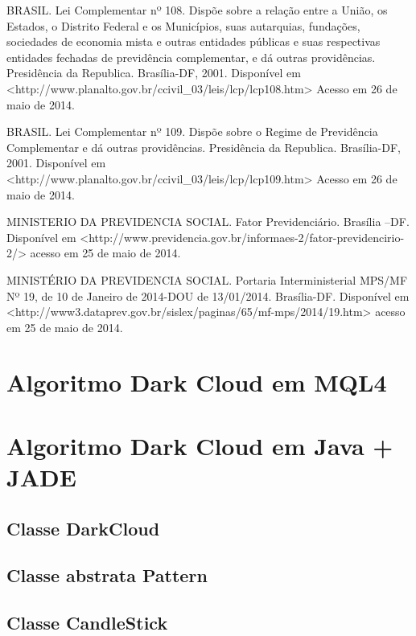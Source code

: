\begin{apendicesenv}
BRASIL. Lei Complementar nº 108. Dispõe sobre a relação entre a União, os Estados, o Distrito Federal e os Municípios, suas autarquias, fundações, sociedades de economia mista e outras entidades públicas e suas respectivas entidades fechadas de previdência complementar, e dá outras providências. Presidência da Republica. Brasília-DF, 2001. Disponível em  <http://www.planalto.gov.br/ccivil\_03/leis/lcp/lcp108.htm> Acesso em 26 de maio de 2014.

BRASIL. Lei Complementar nº 109. Dispõe sobre o Regime de Previdência Complementar e dá outras providências. Presidência da Republica. Brasília-DF, 2001. Disponível em <http://www.planalto.gov.br/ccivil\_03/leis/lcp/lcp109.htm> Acesso em 26 de maio de 2014.

MINISTERIO DA PREVIDENCIA SOCIAL. Fator Previdenciário. Brasília –DF. Disponível em <http://www.previdencia.gov.br/informaes-2/fator-previdencirio-2/> acesso em 25 de maio de 2014.

MINISTÉRIO DA PREVIDENCIA SOCIAL. Portaria Interministerial MPS/MF Nº 19, de 10 de Janeiro de 2014-DOU de 13/01/2014. Brasília-DF. Disponível em <http://www3.dataprev.gov.br/sislex/paginas/65/mf-mps/2014/19.htm>   acesso em 25 de maio de 2014.

\chapter[ALGORITMO DARK CLOUD EM MQL4]{Algoritmo Dark Cloud em MQL4}


\chapter[ALGORITMO DARK CLOUD EM JAVA + JADE]{Algoritmo Dark Cloud em Java + JADE}
\section{Classe DarkCloud}


\section{Classe abstrata Pattern}


\section{Classe CandleStick}




\end{apendicesenv}
